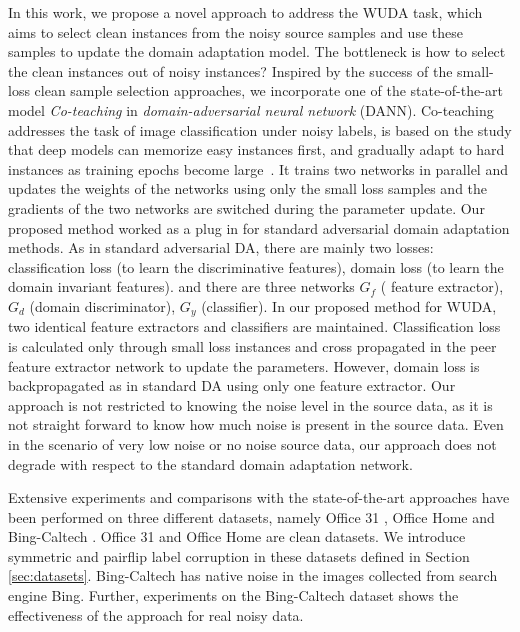 In this work, we propose a novel approach to address the WUDA task, which aims to select clean instances from the noisy source samples and use these samples to update the domain adaptation model. 
The bottleneck is how to select the clean instances out of noisy instances?
Inspired by the success of the small-loss clean sample selection approaches, we incorporate one of the state-of-the-art model \textit{Co-teaching}\cite{coteaching} in \textit{domain-adversarial neural network} (DANN)\cite{dann}. 
Co-teaching addresses the task of image classification under noisy labels, is based on the study that deep models can memorize easy instances first, and gradually adapt to hard instances as training epochs become large~\cite{memorization}. 
It trains two networks in parallel and updates the weights of the networks using only the small loss samples and the gradients of the two networks are switched during the parameter update. 
Our proposed method worked as a plug in for standard adversarial domain adaptation methods.
As in standard adversarial DA, there are mainly two losses: classification loss (to learn the discriminative features), domain loss (to learn the domain invariant features). and there are three networks $G_f$ ( feature extractor), $G_d$ (domain discriminator), $G_y$ (classifier). In our proposed method for WUDA, two identical feature extractors and classifiers are maintained. Classification loss is calculated only through small loss instances and cross propagated in the peer feature extractor network to update the parameters. However, domain loss is backpropagated as in standard DA using only one feature extractor. Our approach is not restricted to knowing the noise level in the source data, as it is not straight forward to know how much noise is present in the source data. Even in the scenario of very low noise or no noise source data, our approach does not degrade with respect to the standard domain adaptation network.

Extensive experiments and comparisons with the state-of-the-art approaches have been performed on three different datasets, namely Office 31 \cite{office31}, Office Home \cite{officehome} and Bing-Caltech 
\cite{bing-caltech}. Office 31 and Office Home are clean datasets. We introduce symmetric and pairflip 
label corruption in these datasets defined in Section \ref{sec:datasets}. Bing-Caltech has native noise in the images collected from search engine Bing. Further, experiments on the Bing-Caltech dataset shows the effectiveness of the approach for real noisy data.
